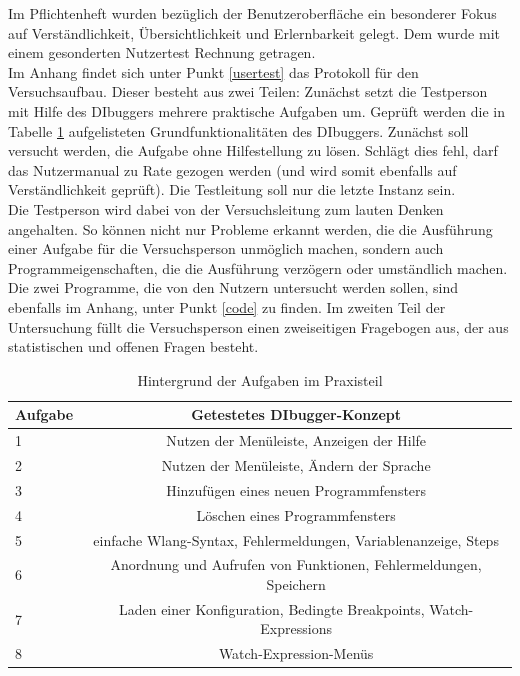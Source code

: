 \documentclass[parskip=full]{scrartcl}
\begin{document}
Im Pflichtenheft wurden bezüglich der Benutzeroberfläche ein besonderer Fokus auf Verständlichkeit, Übersichtlichkeit und Erlernbarkeit gelegt. Dem wurde mit einem gesonderten Nutzertest Rechnung getragen. \\
Im Anhang findet sich unter Punkt \ref{usertest} das Protokoll für den Versuchsaufbau. Dieser besteht aus zwei Teilen: Zunächst setzt die Testperson mit Hilfe des DIbuggers mehrere praktische Aufgaben um. Geprüft werden die in Tabelle \ref{testfaelle} aufgelisteten Grundfunktionalitäten des DIbuggers. Zunächst soll versucht werden, die Aufgabe ohne Hilfestellung zu lösen. Schlägt dies fehl, darf das Nutzermanual zu Rate gezogen werden (und wird somit ebenfalls auf Verständlichkeit geprüft). Die Testleitung soll nur die letzte Instanz sein. \\
Die Testperson wird dabei von der Versuchsleitung zum lauten Denken angehalten. So können nicht nur Probleme erkannt werden, die die Ausführung einer Aufgabe für die Versuchsperson unmöglich machen, sondern auch Programmeigenschaften, die die Ausführung verzögern oder umständlich machen. \\
Die zwei Programme, die von den Nutzern untersucht werden sollen, sind ebenfalls im Anhang, unter Punkt \ref{code} zu finden.
Im zweiten Teil der Untersuchung füllt die Versuchsperson einen zweiseitigen Fragebogen aus, der aus statistischen und offenen Fragen besteht.

\begin{table}
\begin{tabular}{l||c}
   	Aufgabe & Getestetes DIbugger-Konzept \\
	\hline
	\hline
	1 & Nutzen der Menüleiste, Anzeigen der Hilfe\\
	2 & Nutzen der Menüleiste, Ändern der Sprache\\
	3 & Hinzufügen eines neuen Programmfensters \\
	4 & Löschen eines Programmfensters \\
	5 & einfache Wlang-Syntax, Fehlermeldungen, Variablenanzeige, Steps \\
	6 & Anordnung und Aufrufen von Funktionen, Fehlermeldungen, Speichern \\
	7 & Laden einer Konfiguration, Bedingte Breakpoints, Watch-Expressions \\
	8 & Watch-Expression-Menüs


\end{tabular}
\label{testfaelle}
\caption{Hintergrund der Aufgaben im Praxisteil}
\end{table}
\end{document}
